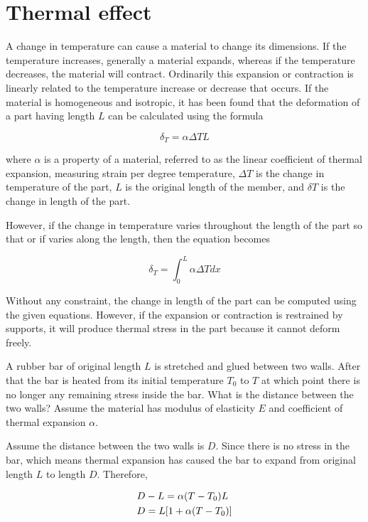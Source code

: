 \documentclass[a4paper,openany,12pt]{book}
\begin{document}
\section{Thermal effect}
\label{thermal-effect}
A change in temperature can cause a material to change its dimensions.
If the temperature increases, generally a material expands, whereas if
the temperature decreases, the material will contract. Ordinarily this
expansion or contraction is linearly related to the temperature increase
or decrease that occurs. If the material is homogeneous and isotropic,
it has been found that the deformation of a part having length \(L\) can
be calculated using the formula

$$\delta _T = \alpha \Delta TL$$

where \(\alpha\) is a property of a material, referred to as the linear
coefficient of thermal expansion, measuring strain per degree
temperature, \(\Delta T\) is the change in temperature of the part, \(L\) is
the original length of the member, and \(\delta T\) is the change in
length of the part.

However, if the change in temperature varies throughout the length of
the part so that or if varies along the length, then the equation
becomes

$$\delta _T = \int_0^L \alpha \Delta Tdx$$

Without any constraint, the change in length of the part can be computed
using the given equations. However, if the expansion or contraction is
restrained by supports, it will produce thermal stress in the part
because it cannot deform freely.

A rubber bar of original length \(L\) is stretched and glued between two
walls. After that the bar is heated from its initial temperature \(T_0\)
to \(T\) at which point there is no longer any remaining stress inside the
bar. What is the distance between the two walls? Assume the material has
modulus of elasticity \(E\) and coefficient of thermal expansion \(\alpha\).


Assume the distance between the two walls is \(D\). Since there is no
stress in the bar, which means thermal expansion has caused the bar to
expand from original length \(L\) to length \(D\). Therefore,

$$\begin{gathered}
  D - L = \alpha (T - T_0)L \hfill \\
  D = L[1 + \alpha (T - T_0)] \hfill \\ 
\end{gathered}$$
\end{document}

